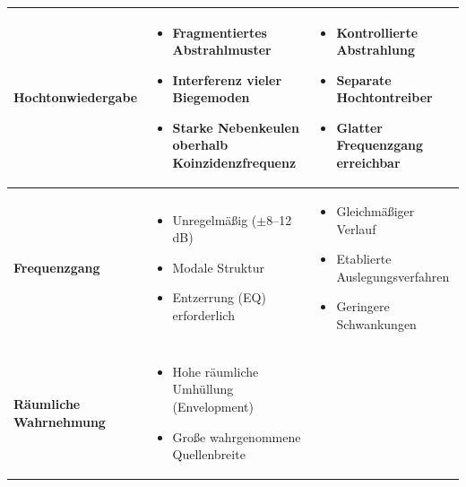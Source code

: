 \begin{table}[htbp]
\begin{tabularx}{\textwidth}{|X|X|X|}
\hline
\textbf{Hochton\-wiedergabe} &
\vspace{-2mm}
\begin{itemize}[leftmargin=*, nosep, topsep=0pt, parsep=0pt]
    \item Fragmentiertes Abstrahlmuster
    \item Interferenz vieler Biegemoden
    \item Starke Nebenkeulen oberhalb Koinzidenzfrequenz
\end{itemize}
\vspace{-2mm}
&
\vspace{-2mm}
\begin{itemize}[leftmargin=*, nosep, topsep=0pt, parsep=0pt]
    \item Kontrollierte Abstrahlung
    \item Separate Hochtontreiber
    \item Glatter Frequenzgang erreichbar
\end{itemize}
\vspace{-2mm} \\
\hline
\textbf{Frequenzgang} &
\vspace{-2mm}
\begin{itemize}[leftmargin=*, nosep, topsep=0pt, parsep=0pt]
    \item Unregelmäßig ($\pm$8--12\,dB)
    \item Modale Struktur
    \item Entzerrung (EQ) erforderlich
\end{itemize}
\vspace{-2mm}
&
\vspace{-2mm}
\begin{itemize}[leftmargin=*, nosep, topsep=0pt, parsep=0pt]
    \item Gleichmäßiger Verlauf
    \item Etablierte Auslegungsverfahren
    \item Geringere Schwankungen
\end{itemize}
\vspace{-2mm} \\
\hline
\textbf{Räumliche Wahrnehmung} &
\vspace{-2mm}
\begin{itemize}[leftmargin=*, nosep, topsep=0pt, parsep=0pt]
    \item Hohe räumliche Umhüllung (Envelopment)
    \item Große wahrgenommene Quellenbreite
\end{itemize}
\vspace{-2mm}

\end{tabularx}
\end{table}
